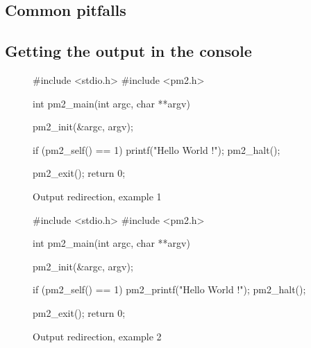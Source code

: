 \documentclass[a4paper,11pt]{report}
\begin{document}
\subsection{Common pitfalls}


\subsection{Getting the output in the console}
\begin{figure}[p]
\begin{center}
\begin{boxedminipage}{0.8\textwidth}
\begin{footnotesize}
\begin{listing}{0}
 #include <stdio.h>
 #include <pm2.h>

 int pm2_main(int argc, char **argv)
 {
   pm2_init(&argc, argv);

   if (pm2_self() == 1)
     {
       printf("Hello World !\n");    
       pm2_halt();
     }
  
   pm2_exit();
   return 0;
 }
\end{listing}
\end{footnotesize}
\end{boxedminipage}
\end{center}
\caption{Output redirection, example 1\label{fig:ex2-1}}
\end{figure}

\begin{figure}[p]
\begin{center}
\begin{boxedminipage}{0.8\textwidth}
\begin{footnotesize}
\begin{listing}{0}
 #include <stdio.h>
 #include <pm2.h>

 int pm2_main(int argc, char **argv)
 {
   pm2_init(&argc, argv);

   if (pm2_self() == 1)
     {
       pm2_printf("Hello World !\n");    
       pm2_halt();
     }
  
   pm2_exit();
   return 0;
 }
\end{listing}
\end{footnotesize}
\end{boxedminipage}
\end{center}
\caption{Output redirection, example 2\label{fig:ex2-2}}
\end{figure}

\afterpage{\clearpage}
\end{document}
